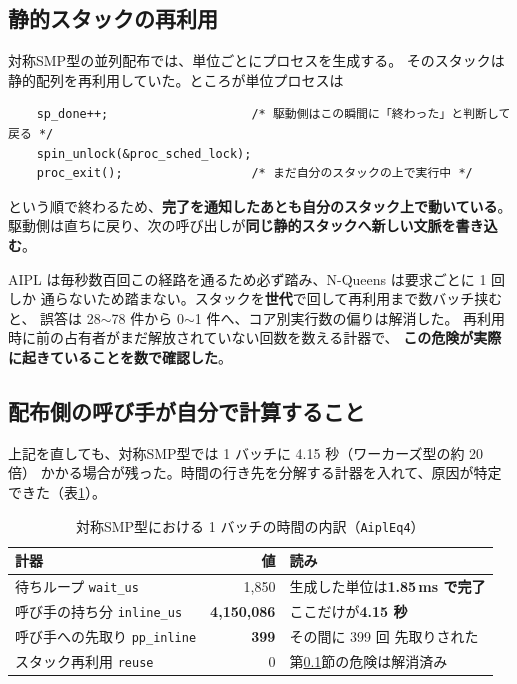 \documentclass[a4paper,11pt]{ltjsarticle}
\begin{document}
\subsection{静的スタックの再利用}\label{sec:stk}
対称SMP型の並列配布では、単位ごとにプロセスを生成する。
そのスタックは静的配列を再利用していた。ところが単位プロセスは

\begin{lstlisting}
    sp_done++;                    /* 駆動側はこの瞬間に「終わった」と判断して戻る */
    spin_unlock(&proc_sched_lock);
    proc_exit();                  /* まだ自分のスタックの上で実行中 */
\end{lstlisting}

\noindent
という順で終わるため、\textbf{完了を通知したあとも自分のスタック上で動いている}。
駆動側は直ちに戻り、次の呼び出しが\textbf{同じ静的スタックへ新しい文脈を書き込む}。

AIPL は毎秒数百回この経路を通るため必ず踏み、N-Queens は要求ごとに 1 回しか
通らないため踏まない。スタックを\textbf{世代}で回して再利用まで数バッチ挟むと、
誤答は 28$\sim$78 件から 0$\sim$1 件へ、コア別実行数の偏りは解消した。
再利用時に前の占有者がまだ解放されていない回数を数える計器で、
\textbf{この危険が実際に起きていることを数で確認した}。

\subsection{配布側の呼び手が自分で計算すること}\label{sec:inline}
上記を直しても、対称SMP型では 1 バッチに 4.15 秒（ワーカーズ型の約 20 倍）
かかる場合が残った。時間の行き先を分解する計器を入れて、原因が特定できた（表\ref{tab:inline}）。

\begin{table}[t]
\centering
\caption{対称SMP型における 1 バッチの時間の内訳（\texttt{AiplEq4}）}
\label{tab:inline}
\begin{tabular}{lrl}
\toprule
計器 & 値 & 読み \\
\midrule
待ちループ \texttt{wait\_us} & 1{,}850 & 生成した単位は\textbf{1.85\,ms で完了} \\
呼び手の持ち分 \texttt{inline\_us} & \textbf{4{,}150{,}086} & ここだけが\textbf{4.15 秒} \\
呼び手への先取り \texttt{pp\_inline} & \textbf{399} & その間に 399 回 先取りされた \\
スタック再利用 \texttt{reuse} & 0 & 第\ref{sec:stk}節の危険は解消済み \\
\bottomrule
\end{tabular}
\end{table}
\end{document}

